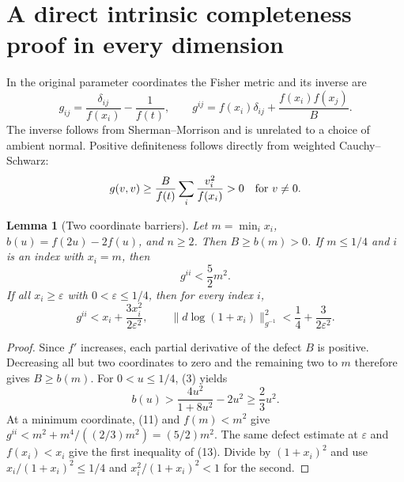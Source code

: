 \documentclass[11pt,a4paper]{article}
\newtheorem{lemma}{Lemma}
\begin{document}
\section{A direct intrinsic completeness proof in every dimension}
In the original parameter coordinates the Fisher metric and its inverse
are
\[
 g_{ij}=\frac{\delta_{ij}}{f(x_i)}-\frac1{f(t)},\qquad
 g^{ij}=f(x_i)\delta_{ij}+\frac{f(x_i)f(x_j)}B.
\tag{11}
\]
The inverse follows from Sherman--Morrison and is unrelated to a choice
of ambient normal. Positive definiteness follows directly from
weighted Cauchy--Schwarz:
\[
 g(v,v)\ge\frac{B}{f(t)}\sum_i\frac{v_i^2}{f(x_i)}>0
 \quad\hbox{for }v\ne0.
\]

\begin{lemma}[Two coordinate barriers]
Let $m=\min_i x_i$, $b(u)=f(2u)-2f(u)$, and $n\ge2$. Then
$B\ge b(m)>0$. If $m\le1/4$ and $i$ is an index with $x_i=m$, then
\[
 g^{ii}<\frac52m^2.
\tag{12}
\]
If all $x_i\ge\varepsilon$ with $0<\varepsilon\le1/4$, then for every
index $i$,
\[
 g^{ii}<x_i+\frac{3x_i^2}{2\varepsilon^2},\qquad
 \|d\log(1+x_i)\|_{g^{-1}}^2
 <\frac14+\frac3{2\varepsilon^2}.
\tag{13}
\]
\end{lemma}
\begin{proof}
Since $f'$ increases, each partial derivative of the defect $B$ is
positive. Decreasing all but two coordinates to zero and the remaining
two to $m$ therefore gives $B\ge b(m)$. For $0<u\le1/4$, (3) yields
\[
 b(u)>\frac{4u^2}{1+8u^2}-2u^2\ge\frac23u^2.
\]
At a minimum coordinate, (11) and $f(m)<m^2$ give
$g^{ii}<m^2+m^4/((2/3)m^2)=(5/2)m^2$.
The same defect estimate at $\varepsilon$ and $f(x_i)<x_i$ give the
first inequality of (13). Divide by $(1+x_i)^2$ and use
$x_i/(1+x_i)^2\le1/4$ and $x_i^2/(1+x_i)^2<1$ for the second.
\end{proof}
\end{document}
